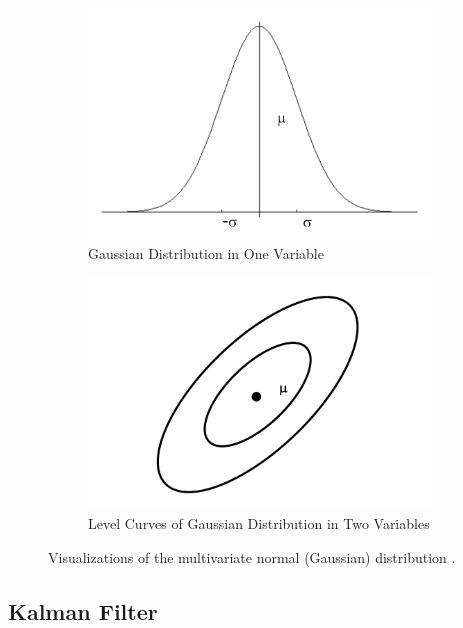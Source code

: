 \documentclass[twoside]{article}
\begin{document}
\begin{figure}[b]
\centering
\begin{subfigure}{.5\textwidth}
  \centering
  \includegraphics[width=.9\linewidth]{gaussian_univariate.png}
  \caption{Gaussian Distribution in One Variable}
  \label{fig:EKF_best}
\end{subfigure}%
\begin{subfigure}{.5\textwidth}
  \centering
  \includegraphics[width=.9\linewidth]{gaussian_multivariate.png}
  \caption{Level Curves of Gaussian Distribution in Two Variables}
  \label{fig:EKF_bad}
\end{subfigure}
\caption{Visualizations of the multivariate normal (Gaussian) distribution \cite{Xmisc}.}
\label{fig:Gaussians}
\end{figure}

\subsection{Kalman Filter}
\end{document}
